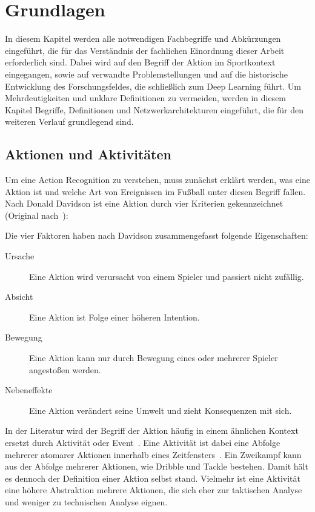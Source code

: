\chapter{Grundlagen}
\label{ch:basics}

In diesem Kapitel werden alle notwendigen Fachbegriffe und Abkürzungen eingeführt, die für das Verständnis der fachlichen Einordnung dieser Arbeit erforderlich sind.
Dabei wird auf den Begriff der Aktion im Sportkontext eingegangen, sowie auf verwandte Problemstellungen und auf die historische Entwicklung des Forschungsfeldes, die schließlich zum Deep Learning führt.
Um Mehrdeutigkeiten und unklare Definitionen zu vermeiden, werden in diesem Kapitel Begriffe, Definitionen und Netzwerkarchitekturen eingeführt, die für den weiteren Verlauf grundlegend sind.


\section{Aktionen und Aktivitäten}
\label{sec:aktionen-und-aktivitaeten}

Um eine Action Recognition zu verstehen, muss zunächst erklärt werden, was eine Aktion ist und welche Art von Ereignissen im Fußball unter diesen Begriff fallen.
Nach Donald Davidson ist eine Aktion durch vier Kriterien gekennzeichnet~\cite{Chen14} (Original nach~\cite{Davidson63}):


Die vier Faktoren haben nach Davidson zusammengefasst folgende Eigenschaften:
\begin{description}
    \item[Ursache] Eine Aktion wird verursacht von einem Spieler und passiert nicht zufällig.
    \item[Absicht] Eine Aktion ist Folge einer höheren Intention.
    \item[Bewegung] Eine Aktion kann nur durch Bewegung eines oder mehrerer Spieler angestoßen werden.
    \item[Nebeneffekte] Eine Aktion verändert seine Umwelt und zieht Konsequenzen mit sich.
\end{description}

In der Literatur wird der Begriff der Aktion häufig in einem ähnlichen Kontext ersetzt durch Aktivität oder Event~\cite{Giancola18}.
Eine Aktivität ist dabei eine Abfolge mehrerer atomarer Aktionen innerhalb eines Zeitfensters~\cite{Dai17}.
Ein Zweikampf kann \zB aus der Abfolge mehrerer Aktionen, wie Dribble und Tackle bestehen.
Damit hält es dennoch der Definition einer Aktion selbst stand.
Vielmehr ist eine Aktivität eine höhere Abstraktion mehrere Aktionen, die sich eher zur taktischen Analyse und weniger zu technischen Analyse eignen.

